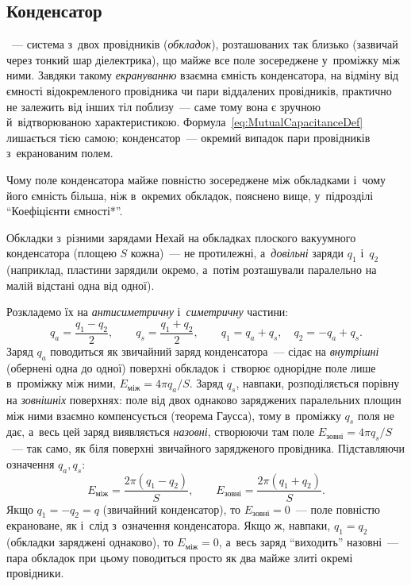 \subsection*{Конденсатор}



~--- система з~двох провідників (\emph{обкладок}), розташованих так
близько (зазвичай через тонкий шар діелектрика), що майже все поле зосереджене у~проміжку
між ними. Завдяки такому \emph{екрануванню} взаємна ємність конденсатора, на відміну від
ємності відокремленого провідника чи пари віддалених провідників, практично не залежить від
інших тіл поблизу~--- саме тому вона є зручною й~відтворюваною характеристикою.
Формула~\eqref{eq:MutualCapacitanceDef} лишається тією самою; конденсатор~--- окремий
випадок пари провідників з~екранованим полем.

Чому поле конденсатора майже повністю зосереджене між обкладками і~чому його ємність
більша, ніж в~окремих обкладок, пояснено вище, у~підрозділі \enquote{Коефіцієнти
ємності*}.

\begin{Example}{Обкладки з~різними зарядами}
	Нехай на обкладках плоского вакуумного конденсатора (площею \(S\) кожна)~--- не
	протилежні, а~\emph{довільні} заряди \(q_1\) і~\(q_2\) (наприклад, пластини зарядили
	окремо, а~потім розташували паралельно на малій відстані одна від одної).

    Розкладемо їх на \emph{антисиметричну} і~\emph{симетричну} частини:
	\begin{equation*}
		q_a = \frac{q_1-q_2}{2}, \qquad q_s = \frac{q_1+q_2}{2}, \qquad q_1 = q_a+q_s,\quad q_2=-q_a+q_s.
	\end{equation*}
	Заряд \(q_a\) поводиться як звичайний заряд конденсатора~--- сідає на
	\emph{внутрішні} (обернені одна до одної) поверхні обкладок і~створює однорідне поле
	лише в~проміжку між ними, \(E_\text{між}=4\pi q_a/S\). Заряд \(q_s\), навпаки,
	розподіляється порівну на \emph{зовнішніх} поверхнях: поле від двох однаково
	заряджених паралельних площин між ними взаємно компенсується (теорема Гаусса), тому
	в~проміжку \(q_s\) поля не дає, а~весь цей заряд виявляється \emph{назовні}, створюючи
	там поле \(E_\text{зовні}=4\pi q_s/S\)~--- так само, як біля поверхні звичайного
	зарядженого провідника. Підставляючи означення \(q_a,q_s\):
	\begin{equation}\label{eq:UnequalPlatesField}
			E_\text{між} = \frac{2\pi(q_1-q_2)}{S}, \qquad E_\text{зовні} = \frac{2\pi(q_1+q_2)}{S}.
	\end{equation}
	Якщо \(q_1=-q_2=q\) (звичайний конденсатор), то \(E_\text{зовні}=0\)~--- поле повністю
	екрановане, як і~слід з~означення конденсатора. Якщо ж, навпаки, \(q_1=q_2\) (обкладки
	заряджені однаково), то \(E_\text{між}=0\), а~весь заряд \enquote{виходить}
	назовні~--- пара обкладок при цьому поводиться просто як два майже злиті окремі
	провідники.
\end{Example}

